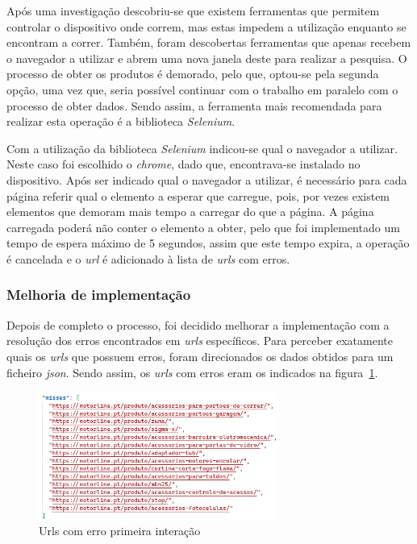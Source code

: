 Após uma investigação descobriu-se que existem ferramentas que permitem controlar o dispositivo onde correm, mas estas impedem a utilização enquanto se encontram a correr. Também, foram descobertas ferramentas que apenas recebem o navegador a utilizar e abrem uma nova janela deste para realizar a pesquisa.
O processo de obter os produtos é demorado, pelo que, optou-se pela segunda opção, uma vez que, seria possível continuar com o trabalho em paralelo com o processo de obter dados. Sendo assim, a ferramenta mais recomendada para realizar esta operação é a biblioteca \textit{Selenium}.

Com a utilização da biblioteca \textit{Selenium} indicou-se qual o navegador a utilizar. Neste caso foi escolhido o \textit{chrome}, dado que, encontrava-se instalado no dispositivo. Após ser indicado qual o navegador a utilizar, é necessário para cada página referir qual o elemento a esperar que carregue, pois, por vezes existem elementos que demoram mais tempo a carregar do que a página. A página carregada poderá não conter o elemento a obter, pelo que foi implementado um tempo de espera máximo de 5 segundos, assim que este tempo expira, a operação é cancelada e o \textit{url} é adicionado à lista de \textit{urls} com erros.

\newpage


\subsubsection{Melhoria de implementação}

Depois de completo o processo, foi decidido melhorar a implementação com a resolução dos erros encontrados em \textit{urls} específicos. Para perceber exatamente quais os \textit{urls} que possuem erros, foram direcionados os dados obtidos para um ficheiro \textit{\acrshort{json}}. Sendo assim, os \textit{urls} com erros eram os indicados na figura~\ref{fig:57}.

\begin{figure}[htb]
  \centering
  
  \includegraphics[width=0.7\textwidth]{images/implementacao/scraper/urls_erro_iteracao_1.png}
  \caption{Urls com erro primeira interação}
  \label{fig:57}
\end{figure}

